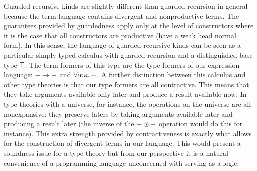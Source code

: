 Guarded recursive kinds are slightly different than guarded recursion
in general because the term language contains divergent and
nonproductive terms. The guarantees provided by guardedness apply only
at the level of constructors where it is the case that all
constructors are productive (have a weak head normal form). In this
sense, the language of guarded recursive kinds can be seen as a
particular simply-typed calculus with guarded recursion and a
distinguished base type $\mathsf{T}$. The term-formers of this type are the
type-formers of our expression language: $- \to -$ and
$\forall \alpha {:} \kappa.\, -$. A further distinction between this calculus
and other type theories is that our type formers are all
contractive. This means that they take arguments available only later
and produce a result available now. In type theories with a universe,
for instance, the operations on the universe are all nonexpansive:
they preserve laters by taking arguments available later and producing
a result later (the inverse of the $- \circledast -$ operation would do this
for instance). This extra strength provided by contractiveness is
exactly what allows for the construction of divergent terms in our
language. This would present a soundness issue for a type theory but
from our perspective it is a natural convenience of a programming
language unconcerned with serving as a logic.

